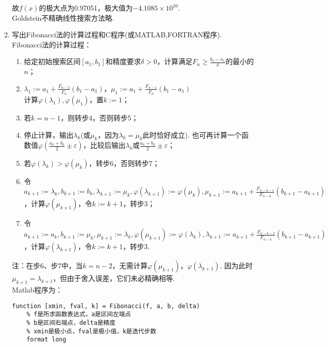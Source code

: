 \begin{enumerate}
{\begin{table}[H]
\begin{tabular}{|c|c|c|c|c|c|c|c|c|}
        \end{tabular}
    \end{table}}
    故$f(x)$的极大点为0.97051，极大值为$-4.1085\times10^{10}$.\\
    Goldstein不精确线性搜索方法略.
    \item 写出Fibonacci法的计算过程和C程序(或MATLAB,FORTRAN程序).\\
    \sol Fibonacci法的计算过程：
    \begin{enumerate}[label=步\arabic*:,left=0em]
        \item 给定初始搜索区间$[a_1,b_1]$和精度要求$\delta > 0$，计算满足$\displaystyle F_n \geqslant \frac{b_1-a_1}{\delta}$的最小的$n$；
        \item $\displaystyle \lambda_1 := a_1 + \frac{F_{n-2}}{F_n}(b_1-a_1)$，$\displaystyle \mu_1 := a_1 + \frac{F_{n-1}}{F_n}(b_1-a_1)$\\
        计算$\varphi(\lambda_1),\varphi(\mu_1)$，置$k:=1$；
        \item 若$k = n - 1$，则转步4，否则转步5；
        \item 停止计算，输出$\lambda_k$(或$\mu_k$，因为$\lambda_k = \mu_k$此时恰好成立). 也可再计算一个函数值$\displaystyle \varphi \left(\frac{a_k+b_k}{2}\pm\varepsilon\right)$，比较后输出$\lambda_k$或$\displaystyle \frac{a_k+b_k}{2}\pm\varepsilon$；
        \item 若$\varphi(\lambda_k) > \varphi(\mu_k)$，转步6，否则转步7；
        \item 令$\displaystyle a_{k+1} := \lambda_k, b_{k+1} := b_k, \lambda_{k+1} := \mu_k, \varphi(\lambda_{k+1}) := \varphi(\mu_k), \mu_{k+1} := a_{k+1} + \frac{F_{n-k-1}}{F_{n-k}}(b_{k+1}-a_{k+1})$，计算$\varphi(\mu_{k+1})$，令$k := k+1$，转步3；
        \item 令$\displaystyle a_{k+1} := a_k, b_{k+1} := \mu_k, \mu_{k+1} := \lambda_k, \varphi(\mu_{k+1}) := \varphi(\lambda_k), \lambda_{k+1} := a_{k+1} + \frac{F_{n-k-2}}{F_{n-k}}(b_{k+1}-a_{k+1})$，计算$\varphi(\lambda_{k+1})$，令$k := k+1$，转步3.
    \end{enumerate}
    注：在步6、步7中，当$k = n - 2$，无需计算$\varphi(\mu_{k+1})$，$\varphi(\lambda_{k+1})$. 因为此时$\mu_{k+1} = \lambda_{k+1}$，但由于舍入误差，它们未必精确相等.\\
    Matlab程序为：
    \begin{lstlisting}
function [xmin, fval, k] = Fibonacci(f, a, b, delta)
    % f是所求函数表达式，a是区间左端点
    % b是区间右端点，delta是精度
    % xmin是极小点，fval是极小值，k是迭代步数
    format long

\end{lstlisting}
\end{enumerate}

